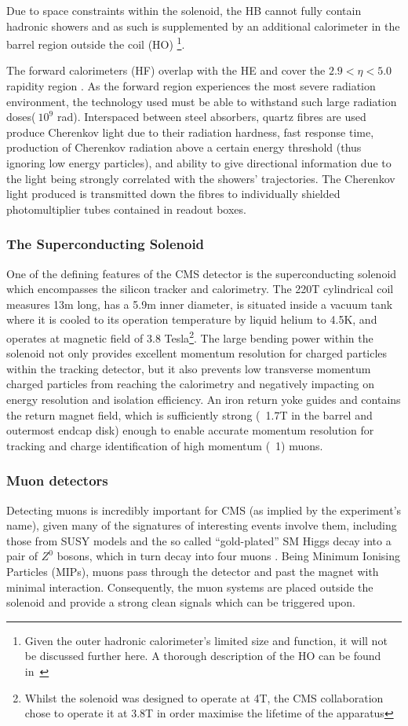 Due to space constraints within the solenoid, the HB cannot fully contain hadronic showers and as such is supplemented by an additional calorimeter in the barrel region outside the coil (HO) \footnote{Given the outer hadronic calorimeter's limited size and function, it will not be discussed further here. A thorough description of the HO can be found in~\cite{HO}}.

The forward calorimeters (HF) overlap with the HE and cover the $2.9 < \eta < 5.0$ rapidity region \cite{HF}.
As the forward region experiences the most severe radiation environment, the technology used must be able to withstand such large radiation doses($~10^{9}$ rad). 
Interspaced between steel absorbers, quartz fibres are used produce Cherenkov light due to their radiation hardness, fast response time, production of Cherenkov radiation above a certain energy threshold (thus ignoring low energy particles), and ability to give directional information due to the light being strongly correlated with the showers' trajectories.
The Cherenkov light produced is transmitted down the fibres to individually shielded photomultiplier tubes contained in readout boxes.

\subsubsection{The Superconducting Solenoid}
One of the defining features of the CMS detector is the superconducting solenoid which encompasses the silicon tracker and calorimetry.
The 220T cylindrical coil measures 13m long, has a 5.9m inner diameter, is situated inside a vacuum tank where it is cooled to its operation temperature by liquid helium to 4.5K, and operates at magnetic field of 3.8 Tesla\footnote{Whilst the solenoid was designed to operate at 4T, the CMS collaboration chose to operate it at 3.8T in order maximise the lifetime of the apparatus}.
The large bending power within the solenoid not only provides excellent momentum resolution for charged particles within the tracking detector, but it also prevents low transverse momentum charged particles from reaching the calorimetry and negatively impacting on energy resolution and isolation efficiency.
An iron return yoke guides and contains the return magnet field, which is sufficiently strong (~1.7T in the barrel and outermost endcap disk) enough to enable accurate momentum resolution for tracking and charge identification of high momentum (~1\TeVc) muons.

\subsubsection{Muon detectors}
Detecting muons is incredibly important for CMS (as implied by the experiment’s name), given many of the signatures of interesting events involve them, including those from SUSY models and the so called “gold-plated” SM Higgs decay into a pair of $Z^{0}$ bosons, which in turn decay into four muons . 
Being Minimum Ionising Particles (MIPs), muons pass through the detector and past the magnet with minimal interaction.
Consequently, the muon systems are placed outside the solenoid and provide a strong clean signals which can be triggered upon.

